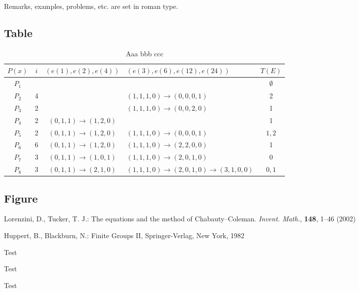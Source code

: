 \documentclass{amse}
\numberwithin{equation}{section} %
\begin{document}
\begin{remark}\label{re:1.2}
Remarks, examples, problems, etc. are set in roman type.
\end{remark}


\subsection{Table}

\begin{table}
\begin{tabular}{|c|c|c|l|c|}
\hline $P(x)$ & $i$& $(e(1),e(2),e(4))$ & $(e(3),e(6),e(12),e(24))$ & $T(E)$ \\
\hline $P_1$  &    & & &$\emptyset$ \\
\hline $P_2$  & 4  & & $(1,1,1,0)\rightarrow(0,0,0,1)$ &2\\
\hline $P_3$  & 2  & &$(1,1,1,0)\rightarrow(0,0,2,0)$ &1\\
\hline $P_4$  & 2  & $(0,1,1)\rightarrow(1,2,0)$ & &1\\
\hline $P_5$  & 2  & $(0,1,1)\rightarrow(1,2,0)$ &$(1,1,1,0)\rightarrow(0,0,0,1)$ &$1,2$\\
\hline $P_6$  & 6  & $(0,1,1)\rightarrow(1,2,0)$ &$(1,1,1,0)\rightarrow(2,2,0,0)$ &1\\
\hline $P_7$  & 3  & $(0,1,1)\rightarrow(1,0,1)$ &$(1,1,1,0)\rightarrow(2,0,1,0)$ &0\\
\hline $P_8$  & 3  & $(0,1,1)\rightarrow(2,1,0)$ &$(1,1,1,0)\rightarrow(2,0,1,0) \rightarrow(3,1,0,0)$ &$0,1$\\
\hline
\end{tabular}
\caption{Aaa bbb ccc\label{tab}}
\end{table}


\subsection{Figure}





\begin{thebibliography}{99}

Lorenzini, D., Tucker, T. J.: The equations and the method of
Chabauty--Coleman. \emph{Invent. Math.}, \textbf{148}, 1--46
(2002)

Huppert, B., Blackburn, N.: Finite Groups II, Springer-Verlag, New
York, 1982

Test

Test

Test

\end{thebibliography}
\end{document}
